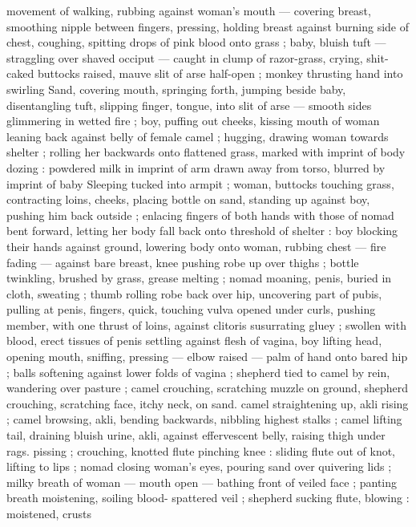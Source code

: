 movement of walking, rubbing against woman's mouth --- covering 
breast, smoothing nipple between fingers, pressing, holding breast 
against burning side of chest, coughing, spitting drops of pink blood 
onto grass ; baby, bluish tuft --- straggling over shaved occiput --- 
caught in clump of razor-grass, crying, shit-caked buttocks raised, 
mauve slit of arse half-open ; monkey thrusting hand into swirling 
Sand, covering mouth, springing forth, jumping beside baby, 
disentangling tuft, slipping finger, tongue, into slit of arse --- smooth 
sides glimmering in wetted fire ; boy, puffing out cheeks, kissing 
mouth of woman leaning back against belly of female camel ; 
hugging, drawing woman towards shelter ; rolling her backwards onto 
flattened grass, marked with imprint of body dozing : powdered milk 
in imprint of arm drawn away from torso, blurred by imprint of baby 
Sleeping tucked into armpit ; woman, buttocks touching grass, 
contracting loins, cheeks, placing bottle on sand, standing up against 
boy, pushing him back outside ; enlacing fingers of both hands with 
those of nomad bent forward, letting her body fall back onto 
threshold of shelter : boy blocking their hands against ground, 
lowering body onto woman, rubbing chest --- fire fading --- against 
bare breast, knee pushing robe up over thighs ; bottle twinkling, 
brushed by grass, grease melting ; nomad moaning, penis, buried in 
cloth, sweating ; thumb rolling robe back over hip, uncovering part of 
pubis, pulling at penis, fingers, quick, touching vulva opened under 
curls, pushing member, with one thrust of loins, against clitoris 
susurrating gluey ; swollen with blood, erect tissues of penis settling 
against flesh of vagina, boy lifting head, opening mouth, sniffing, 
pressing --- elbow raised --- palm of hand onto bared hip ; balls 
softening against lower folds of vagina ; shepherd tied to camel by 
rein, wandering over pasture ; camel crouching, scratching muzzle on 
ground, shepherd crouching, scratching face, itchy neck, on sand. 
camel straightening up, akli rising ; camel browsing, akli, bending 
backwards, nibbling highest stalks ; camel lifting tail, draining bluish 
urine, akli, against effervescent belly, raising thigh under rags. 
pissing ; crouching, knotted flute pinching knee : sliding flute out of 
knot, lifting to lips ; nomad closing woman's eyes, pouring sand over 
quivering lids ; milky breath of woman --- mouth open --- bathing 
front of veiled face ; panting breath moistening, soiling blood- 
spattered veil ; shepherd sucking flute, blowing : moistened, crusts 
